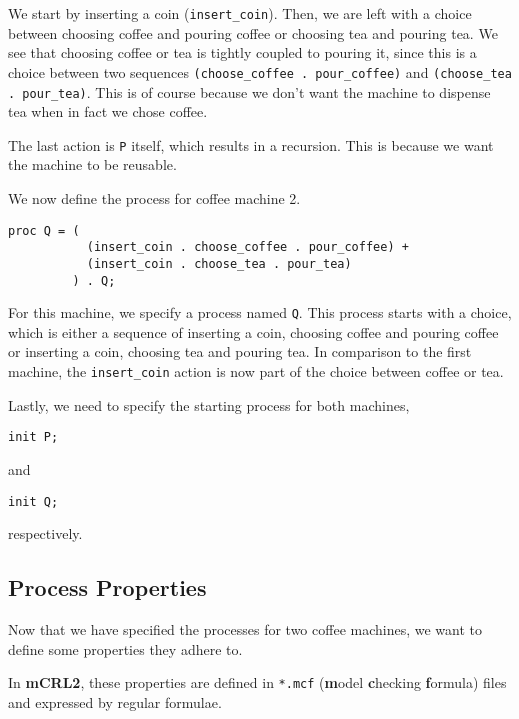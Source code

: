 \documentclass{clseminar}
\begin{document}
  We start by inserting a coin (\texttt{insert\_coin}). Then, we are left with a choice between choosing coffee and pouring coffee or choosing tea and pouring tea. We see that choosing coffee or tea is tightly coupled to pouring it, since this is a choice between two sequences \texttt{(choose\_coffee . pour\_coffee)} and \texttt{(choose\_tea . pour\_tea)}. This is of course because we don't want the machine to dispense tea when in fact we chose coffee.

  The last action is \texttt{P} itself, which results in a recursion. This is because we want the machine to be reusable.

  We now define the process for coffee machine 2.

  \begin{lstlisting}[language=mCRL2]
proc Q = (
           (insert_coin . choose_coffee . pour_coffee) +
           (insert_coin . choose_tea . pour_tea)
         ) . Q;
  \end{lstlisting}

  For this machine, we specify a process named \texttt{Q}. This process starts with a choice, which is either a sequence of inserting a coin, choosing coffee and pouring coffee or inserting a coin, choosing tea and pouring tea. In comparison to the first machine, the \texttt{insert\_coin} action is now part of the choice between coffee or tea.

  Lastly, we need to specify the starting process for both machines,

  \begin{lstlisting}[language=mCRL2]
init P;
  \end{lstlisting}

  and

  \begin{lstlisting}[language=mCRL2]
init Q;
  \end{lstlisting}

  respectively.

  \subsection{Process Properties}

  Now that we have specified the processes for two coffee machines, we want to define some properties they adhere to.

  In \textbf{mCRL2}, these properties are defined in \texttt{*.mcf} (\textbf{m}odel \textbf{c}hecking \textbf{f}ormula) files and expressed by regular formulae.
\end{document}
